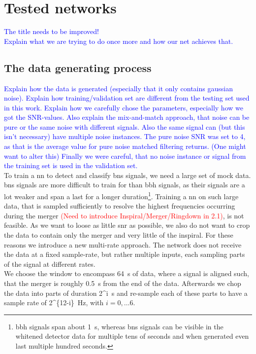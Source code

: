 \section{Tested networks}
\textcolor{blue}{The title needs to be improved!\\Explain what we are trying to do once more and how our net achieves that.}
\subsection{The data generating process}
\textcolor{blue}{Explain how the data is generated (especially that it only contains gaussian noise). Explain how training/validation set are different from the testing set used in this work. Explain how we carefully chose the parameters, especially how we got the SNR-values. Also explain the mix-and-match approach, that noise can be pure or the same noise with different signals. Also the same signal can (but this isn't necessary) have multiple noise instances. The pure noise SNR was set to 4, as that is the average value for pure noise matched filtering returns. (One might want to alter this) Finally we were careful, that no noise instance or signal from the training set is used in the validation set.}\\
To train a \gls{nn} to detect and classify \gls{bns} signals, we need a large set of mock data. \gls{bns} signals are more difficult to train for than \gls{bbh} signals, as their signals are a lot weaker and span a last for a longer duration\footnote{\gls{bbh} signals span about \SI{1}{\s}, whereas \gls{bns} signals can be visible in the whitened detector data for multiple tens of seconds \cite{gw170817} and when generated even last multiple hundred seconds.}. Training a \gls{nn} on such large data, that is sampled sufficiently to resolve the highest frequencies occurring during the merger \textcolor{red}{(Need to introduce Inspiral/Merger/Ringdown in 2.1)}, is not feasible. As we want to loose as little \gls{snr} as possible, we also do not want to crop the data to contain only the merger and very little of the inspiral. For these reasons we introduce a new multi-rate approach. The network does not receive the data at a fixed sample-rate, but rather multiple inputs, each sampling parts of the signal at different rates.\\
We choose the window to encompass \SI{64}{\s} of data, where a signal is aligned such, that the merger is roughly \SI{0.5}{\s} from the end of the data. Afterwards we chop the data into parts of duration \SI[parse-numbers=false]{2^i}{\s} and re-sample each of these parts to have a sample rate of \SI[parse-numbers=false]{2^{12-i}}{\hertz}, with $i=0,\dotsc 6$.
